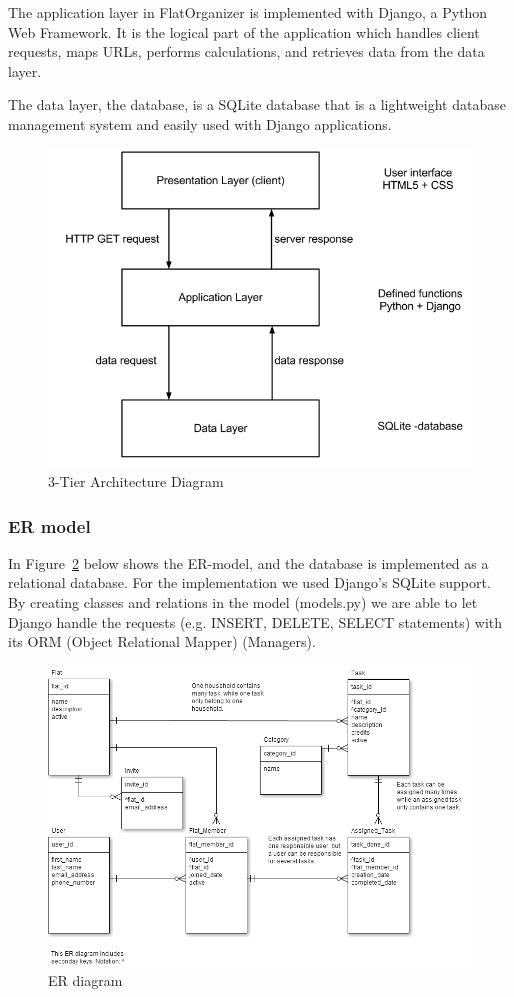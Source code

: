 \documentclass{sig-alt-release2}
\begin{document}
The application layer in FlatOrganizer is implemented with Django, a Python Web Framework. It is the logical part of the application which handles client requests, maps URLs, performs calculations, and retrieves data from the data layer.

The data layer, the database, is a SQLite database that is a lightweight database management system and easily used with Django applications.

\begin{figure}[!ht]
\includegraphics[scale=0.3]{3tier}
\caption{ 3-Tier Architecture Diagram}
\label{fig:3tier}
\end{figure}


\subsubsection{ER model}
In Figure~\ref{fig:er} below shows the ER-model, and the database is implemented as a relational database. For the implementation we used Django's SQLite support. By creating classes and relations in the model (models.py) we are able to let Django handle the requests (e.g. INSERT, DELETE, SELECT statements) with its ORM (Object Relational Mapper) (Managers).

\begin{figure}[!ht]
\includegraphics[scale=0.3]{er}
\caption{ ER diagram}
\label{fig:er}
\end{figure}
\end{document}

